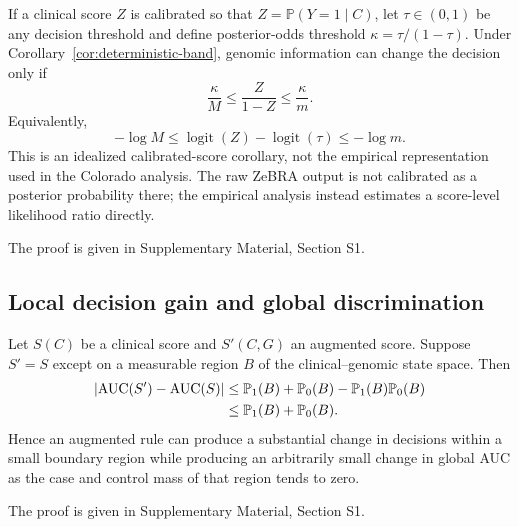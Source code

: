 \begin{corollary}
\label{cor:zebra}
If a clinical score $Z$ is calibrated so that $Z=\mathbb{P}(Y=1\mid C)$, let $\tau\in(0,1)$ be any decision threshold and define posterior-odds threshold $\kappa=\tau/(1-\tau)$. Under Corollary~\ref{cor:deterministic-band}, genomic information can change the decision only if
\begin{equation}
\boxed{\frac{\kappa}{M}\le \frac{Z}{1-Z}\le \frac{\kappa}{m}.}
\label{eq:zboundary}
\end{equation}
Equivalently,
\begin{equation}
-\log M\le \operatorname{logit}(Z)-\operatorname{logit}(\tau)\le -\log m.
\end{equation}
This is an idealized calibrated-score corollary, not the empirical representation used in the Colorado analysis. The raw ZeBRA output is not calibrated as a posterior probability there; the empirical analysis instead estimates a score-level likelihood ratio directly.
\end{corollary}
The proof is given in Supplementary Material, Section S1.

\subsection{Local decision gain and global discrimination}

\begin{proposition}
\label{prop:auc-local}
Let $S(C)$ be a clinical score and $S'(C,G)$ an augmented score. Suppose $S'=S$ except on a measurable region $B$ of the clinical--genomic state space. Then
\begin{align}
\left|\operatorname{AUC}(S')-\operatorname{AUC}(S)\right|
&\le \mathbb{P}_1(B)+\mathbb{P}_0(B)-\mathbb{P}_1(B)\mathbb{P}_0(B)\\
&\le \mathbb{P}_1(B)+\mathbb{P}_0(B).
\label{eq:auc-local-bound}
\end{align}
Hence an augmented rule can produce a substantial change in decisions within a small boundary region while producing an arbitrarily small change in global AUC as the case and control mass of that region tends to zero.
\end{proposition}
The proof is given in Supplementary Material, Section S1.
